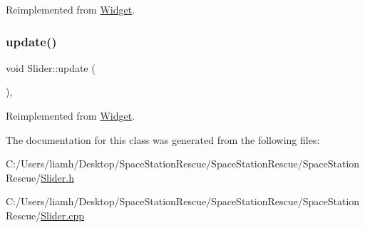 Reimplemented from \mbox{\hyperlink{class_widget_a038576de7f1adf6b29f3ebfd3515f13f}{Widget}}.

\mbox{\label{class_slider_a4ebd527db54ea263c7d0efe4d1f94e1b}} 
\subsubsection{\texorpdfstring{update()}{update()}}
{\footnotesize\ttfamily void Slider\+::update (\begin{DoxyParamCaption}{ }\end{DoxyParamCaption})\hspace{0.3cm}{\ttfamily [override]}, {\ttfamily [virtual]}}



Reimplemented from \mbox{\hyperlink{class_widget_a38aacc92bda1a1e91052873a4a955487}{Widget}}.



The documentation for this class was generated from the following files\+:\begin{DoxyCompactItemize}
\item 
C\+:/\+Users/liamh/\+Desktop/\+Space\+Station\+Rescue/\+Space\+Station\+Rescue/\+Space\+Station\+Rescue/\mbox{\hyperlink{_slider_8h}{Slider.\+h}}\item 
C\+:/\+Users/liamh/\+Desktop/\+Space\+Station\+Rescue/\+Space\+Station\+Rescue/\+Space\+Station\+Rescue/\mbox{\hyperlink{_slider_8cpp}{Slider.\+cpp}}\end{DoxyCompactItemize}
